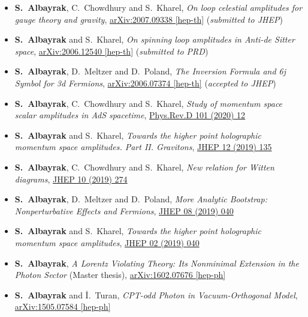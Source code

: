 \documentclass[letterpaper,11pt]{article}
\begin{document}
 \begin{itemize}%
 	\item[] {\bf S.~Albayrak}, C.~Chowdhury and  { S.~Kharel}, \emph{On loop celestial amplitudes for gauge theory and gravity}, \hyperref{https://arxiv.org/abs/2007.09338}{category}{name}{arXiv:2007.09338 [hep-th]} (\emph{submitted to JHEP})
 	
 \item[] {\bf S.~Albayrak} and  { S.~Kharel}, \emph{On spinning loop amplitudes in Anti-de Sitter space}, \hyperref{https://arxiv.org/abs/2006.12540}{category}{name}{arXiv:2006.12540 [hep-th]} (\emph{submitted to PRD})
 
 \item[] {\bf S.~Albayrak}, D.~Meltzer and  { D.~Poland}, \emph{The Inversion Formula and 6j Symbol for 3d Fermions}, \hyperref{https://arxiv.org/abs/2006.07374}{category}{name}{arXiv:2006.07374 [hep-th]} (\emph{accepted to JHEP})
 
 \item[] {\bf S.~Albayrak}, C.~Chowdhury and  { S.~Kharel}, \emph{Study of momentum space scalar amplitudes in AdS spacetime}, \hyperref{https://inspirehep.net/files/950d888f8dbaf39b96ea1bee25d6bda0}{category}{name}{Phys.Rev.D 101 (2020) 12}
 
 \item[] {\bf S.~Albayrak} and  { S.~Kharel}, \emph{Towards the higher point holographic momentum space amplitudes. Part II. Gravitons}, \hyperref{https://inspirehep.net/files/eb148d7ad84e19945017f5ab2aa85393}{category}{name}{JHEP 12 (2019) 135}
 
 \item[] {\bf S.~Albayrak}, C.~Chowdhury and  { S.~Kharel}, \emph{New relation for Witten diagrams}, \hyperref{https://inspirehep.net/files/44b75a5187c14730a849c04e3b909bd3}{category}{name}{JHEP 10 (2019) 274}
 
 \item[] {\bf S.~Albayrak}, D.~Meltzer and  { D.~Poland}, \emph{More Analytic Bootstrap: Nonperturbative Effects and Fermions}, \hyperref{https://inspirehep.net/files/3a3c45b7b08a2948ba1c165463f00fd0}{category}{name}{JHEP 08 (2019) 040}
 
 \item[] {\bf S.~Albayrak} and  { S.~Kharel}, \emph{Towards the higher point holographic momentum space amplitudes}, \hyperref{https://inspirehep.net/files/fdfe40b4cfec540b04df94d4cb9bc1c4}{category}{name}{JHEP 02 (2019) 040}
 
 \item[] {\bf S.~Albayrak}, \emph{A Lorentz Violating Theory: Its Nonminimal Extension in the Photon Sector} (Master thesis), \hyperref{https://arxiv.org/abs/1602.07676}{category}{name}{arXiv:1602.07676 [hep-ph]}
 
 \item[] {\bf S.~Albayrak} and  { İ.~Turan}, \emph{CPT-odd Photon in Vacuum-Orthogonal Model}, \hyperref{https://arxiv.org/abs/1505.07584}{category}{name}{arXiv:1505.07584 [hep-ph]}
 \end{itemize}
\end{document}
